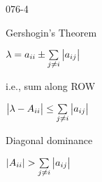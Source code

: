 \begin{mitframe}{076-4}
\begin{listone}
	\item Gershogin's Theorem
    	\begin{listtwo}
        	\item $\lambda=\activity_{\state\state}\pm\sum\limits_{j\neq\state}\big|\activity_{\state{j}}\big|$
            	\begin{listthree}
                	\item i.e., sum along ROW
                \end{listthree}
            \item $\big|\lambda-\helmholtz_{\state\state}\big|\leq\sum\limits_{j\neq\state}\big|\activity_{\state{j}}\big|$
            \item Diagonal dominance
            	\begin{listthree}
                	\item $|\helmholtz_{\state\state}|>\sum\limits_{j\neq\state}\big|\activity_{\state{j}}\big|$
                \end{listthree}
        \end{listtwo}
\end{listone}
\end{mitframe}